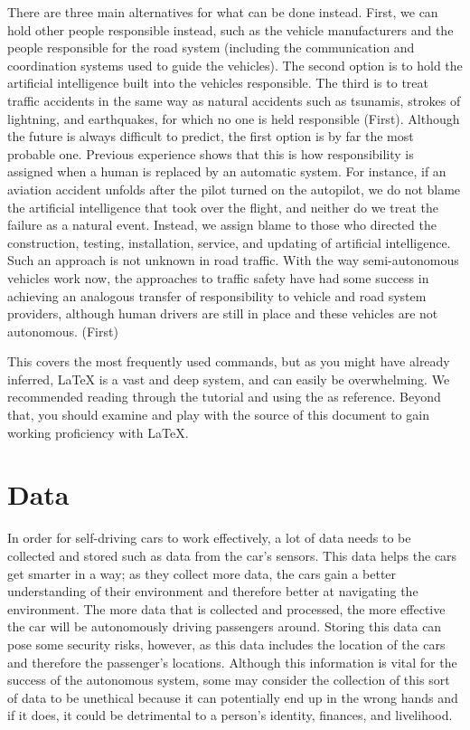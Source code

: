 \documentclass[10pt,twocolumn]{article}
\begin{document}
There are three main alternatives for what can be done instead. First, we can hold other people responsible instead, such as the vehicle manufacturers and the people responsible for the road system (including the communication and coordination systems used to guide the vehicles). The second option is to hold the artificial intelligence built into the vehicles responsible. The third is to treat traffic accidents in the same way as natural accidents such as tsunamis, strokes of lightning, and earthquakes, for which no one is held responsible (First). Although the future is always difficult to predict, the first option is by far the most probable one. Previous experience shows that this is how responsibility is assigned when a human is replaced by an automatic system. For instance, if an aviation accident unfolds after the pilot turned on the autopilot, we do not blame the artificial intelligence that took over the flight, and neither do we treat the failure as a natural event. Instead, we assign blame to those who directed the construction, testing, installation, service, and updating of artificial intelligence. Such an approach is not unknown in road traffic. With the way semi-autonomous vehicles work now, the approaches to traffic safety have had some success in achieving an analogous transfer of responsibility to vehicle and road system providers, although human drivers are still in place and these vehicles are not autonomous. (First)

This covers the most frequently used commands, but as you might have already inferred, LaTeX is a vast and deep system, and can easily be overwhelming.
We recommended reading through the  tutorial \cite{Overleaf2021LearnLaTeXIn} and using the  \cite{WikiBook2022LaTeX} as reference.
Beyond that, you should examine and play with the source of this document to gain working proficiency with LaTeX.

\section{Data}
In order for self-driving cars to work effectively, a lot of data needs to be collected and stored such as data from the car’s sensors. This data helps the cars get smarter in a way; as they collect more data, the cars gain a better understanding of their environment and therefore better at navigating the environment. The more data that is collected and processed, the more effective the car will be autonomously driving passengers around. Storing this data can pose some security risks, however, as this data includes the location of the cars and therefore the passenger’s locations. Although this information is vital for the success of the autonomous system, some may consider the collection of this sort of data to be unethical because it can potentially end up in the wrong hands and if it does, it could be detrimental to a person’s identity, finances, and livelihood. 
\end{document}
